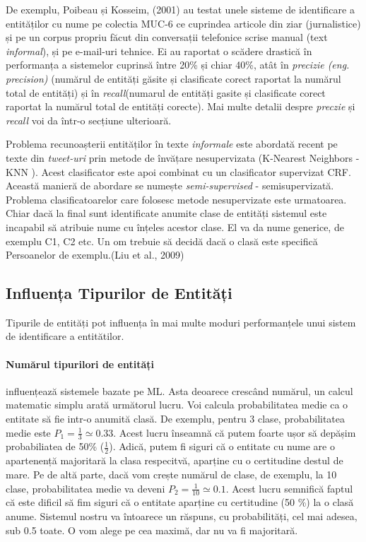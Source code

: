 De exemplu, Poibeau și Kosseim, (2001) \cite{Poibeau01propername} au testat unele sisteme de identificare a entităților cu nume pe colectia MUC-6 ce cuprindea articole din ziar (jurnalistice) și pe un corpus propriu făcut din conversații telefonice scrise manual (text \textit{informal}), și pe e-mail-uri tehnice. Ei au raportat o scădere drastică în performanța a sistemelor cuprinsă între 20\% și chiar 40\%, atât în \textit{precizie (eng. precision)} (numărul de entități  găsite și clasificate corect raportat la numărul total de entități) și în \textit{recall}(numarul de entități gasite și clasificate corect raportat la numărul total de entități corecte). Mai multe detalii despre \textit{preczie} și \textit{recall} voi da într-o secțiune ulterioară.


Problema recunoașterii entităților în texte \textit{informale} este abordată recent pe texte din \textit{tweet-uri} prin metode de învățare nesupervizata (K-Nearest Neighbors - KNN ). Acest clasificator este apoi combinat cu un clasificator supervizat CRF. Această manieră de abordare se numește \textit{semi-supervised} - semisupervizată. Problema clasificatoarelor care folosesc metode nesupervizate este urmatoarea. Chiar dacă la final sunt identificate anumite clase de entități sistemul este incapabil să atribuie nume cu înțeles acestor clase. El va da nume generice, de exemplu C1, C2 etc. Un om trebuie să decidă dacă o clasă este specifică Persoanelor de exemplu.(Liu et al., 2009)\cite{Liu_recognizingnamed}


\subsection{Influența Tipurilor de Entități}

Tipurile de entități pot influența în mai multe moduri performanțele unui sistem de identificare a entitătilor. 

\paragraph{Numărul tipurilori de entități}

influențează sistemele bazate pe ML. Asta deoarece crescând numărul, un calcul matematic simplu arată următorul lucru. Voi calcula probabilitatea medie ca o entitate să fie intr-o anumită clasă. De exemplu, pentru 3 clase, probabilitatea medie este $ P_1 = \frac{1}{3} \simeq 0.33 $. Acest lucru înseamnă că putem foarte ușor să depășim probabiliatea de 50\% ($ \frac{1}{2} $). Adică, putem fi siguri că o entitate cu nume are o apartenență majoritară la clasa respecitvă, aparține cu o certitudine destul de mare. Pe de altă parte, dacă vom crește numărul de clase, de exemplu, la 10 clase, probabilitatea medie va deveni $ P_2 = \frac{1}{10} \simeq 0.1 $. Acest lucru semnifică faptul că este dificil să fim siguri că o entitate aparține cu certitudine (50 \%) la o clasă anume. Sistemul nostru va întoarece un răspuns, cu probabilități, cel mai adesea, sub 0.5 toate. O vom alege pe cea maximă, dar nu va fi majoritară. 

